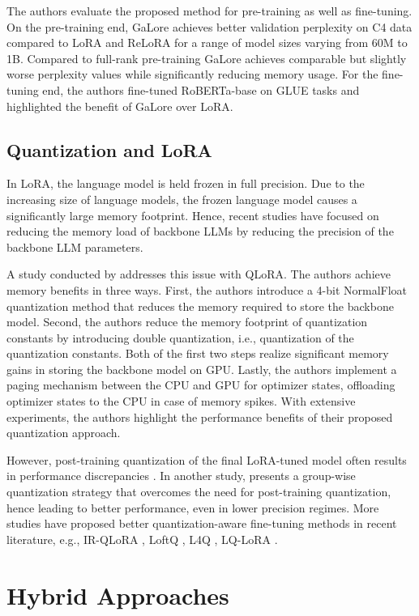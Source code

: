 The authors evaluate the proposed method for pre-training as well as fine-tuning. On the pre-training end, GaLore achieves better validation perplexity on C4 data compared to LoRA \citep{lora} and ReLoRA \citep{relora} for a range of model sizes varying from 60M to 1B. Compared to full-rank pre-training GaLore achieves comparable but slightly worse perplexity values while significantly reducing memory usage. For the fine-tuning end, the authors fine-tuned RoBERTa-base on GLUE tasks and highlighted the benefit of GaLore over LoRA.

\subsection{Quantization and LoRA} In LoRA, the language model is held frozen in full precision. Due to the increasing size of language models, the frozen language model causes a significantly large memory footprint. Hence, recent studies have focused on reducing the memory load of backbone LLMs by reducing the precision of the backbone LLM parameters.

A study conducted by \citet{dettmers2023qlora} addresses this issue with QLoRA. The authors achieve memory benefits in three ways. First, the authors introduce a 4-bit NormalFloat quantization method that reduces the memory required to store the backbone model. Second, the authors reduce the memory footprint of quantization constants by introducing double quantization, i.e., quantization of the quantization constants. Both of the first two steps realize significant memory gains in storing the backbone model on GPU. Lastly, the authors implement a paging mechanism between the CPU and GPU for optimizer states, offloading optimizer states to the CPU in case of memory spikes. With extensive experiments, the authors highlight the performance benefits of their proposed quantization approach.

However, post-training quantization of the final LoRA-tuned model often results in performance discrepancies \citep{xu2023qa}. In another study, \citet{xu2023qa} presents a group-wise quantization strategy that overcomes the need for post-training quantization, hence leading to better performance, even in lower precision regimes. More studies have proposed better quantization-aware fine-tuning methods in recent literature, e.g., IR-QLoRA \citep{qin2024accurate}, LoftQ \citep{li2023loftq}, L4Q \citep{jeon2024l4q}, LQ-LoRA \citep{guo2023lq}.

\section{Hybrid Approaches}
\label{sec:hybrid_section}

